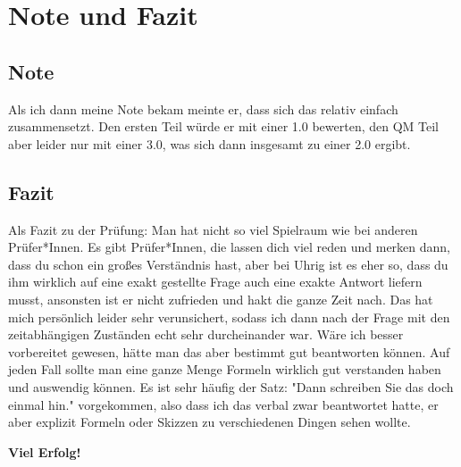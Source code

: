 \section{Note und Fazit}

\subsection{Note}

Als ich dann meine Note bekam meinte er, dass sich das relativ einfach zusammensetzt. Den ersten Teil würde er mit einer \num{1.0} bewerten, den QM Teil aber leider nur mit einer \num{3.0}, was sich dann insgesamt zu einer \num{2.0} ergibt. 

\subsection{Fazit}

\noindent Als Fazit zu der Prüfung: Man hat nicht so viel Spielraum wie bei anderen Prüfer*Innen. Es gibt Prüfer*Innen, die lassen dich viel reden und merken dann, dass du schon ein großes Verständnis hast, aber bei Uhrig ist es eher so, dass du ihm wirklich auf eine exakt gestellte Frage auch eine exakte Antwort liefern musst, ansonsten ist er nicht zufrieden und hakt die ganze Zeit nach. Das hat mich persönlich leider sehr verunsichert, sodass ich dann nach der Frage mit den zeitabhängigen Zuständen echt sehr durcheinander war. Wäre ich besser vorbereitet gewesen, hätte man das aber bestimmt gut beantworten können.
Auf jeden Fall sollte man eine ganze Menge Formeln wirklich gut verstanden haben und auswendig können. Es ist sehr häufig der Satz: "Dann schreiben Sie das doch einmal hin." vorgekommen, also dass ich das verbal zwar beantwortet hatte, er aber explizit Formeln oder Skizzen zu verschiedenen Dingen sehen wollte. 

\noindent \textbf{Viel Erfolg!} 
